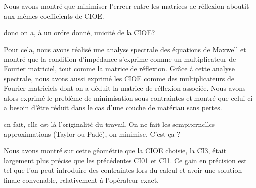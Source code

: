 Nous avons montré que minimiser l'erreur entre les matrices de réflexion aboutit aux mêmes coefficients de CIOE.
\begin{REM}
	donc on a, à un ordre donné, unicité de la CIOE?
\end{REM} 
Pour cela, nous avons réalisé une analyse spectrale des équations de Maxwell et montré que la condition d'impédance s'exprime comme un multiplicateur de Fourier matriciel, tout comme la matrice de réflexion.
Grâce à cette analyse spectrale, nous avons aussi exprimé les CIOE comme des multiplicateurs de Fourier matriciels dont on a déduit la matrice de réflexion associée.
Nous avons alors exprimé le problème de minimisation sous contraintes et montré que celui-ci a besoin d'être réduit dans le cas d'une couche de matériau sans pertes.
\begin{REM}
  en fait, elle est là l’originalité du travail.
  On ne fait les sempiternelles approximations (Taylor ou Padé), on minimise. C'est ça ?
\end{REM} 
Nous avons montré sur cette géométrie que la CIOE choisie, la \hyperlink{ci3}{CI3}, était largement plus précise que les précédentes \hyperlink{ci01}{CI01} et \hyperlink{ci1}{CI1}.
Ce gain en précision est tel que l'on peut introduire des contraintes lors du calcul et avoir une solution finale convenable, relativement à l'opérateur exact.
